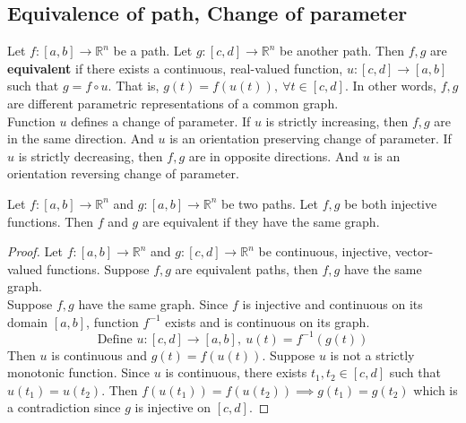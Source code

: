 \subsection{Equivalence of path, Change of parameter}
\begin{definition}
	Let $f:[a,b] \to \mathbb{R}^n$ be a path.
	Let $g : [c,d] \to \mathbb{R}^n$ be another path.
	Then $f,g$ are \textbf{equivalent} if there exists a continuous, real-valued function, $u : [c,d] \to [a,b]$ such that $g = f \circ u$.
	That is, $g(t) = f(u(t)),\ \forall t \in [c,d]$.
	In other words, $f,g$ are different parametric representations of a common graph.\\

	Function $u$ defines a change of parameter.
	If $u$ is strictly increasing, then $f,g$ are in the same direction.
	And $u$ is an orientation preserving change of parameter.
	If $u$ is strictly decreasing, then $f,g$ are in opposite directions.
	And $u$ is an orientation reversing change of parameter.
\end{definition}

\begin{theorem}
	Let $f:[a,b] \to \mathbb{R}^n$ and $g : [a,b] \to \mathbb{R}^n$ be two paths.
	Let $f,g$ be both injective functions.
	Then $f$ and $g$ are equivalent if they have the same graph.
\end{theorem}
\begin{proof}
	Let $f : [a,b] \to \mathbb{R}^n$ and $g : [c,d] \to \mathbb{R}^n$ be continuous, injective, vector-valued functions.
	Suppose $f,g$ are equivalent paths, then $f,g$ have the same graph.\\

	Suppose $f,g$ have the same graph.
	Since $f$ is injective and continuous on its domain $[a,b]$, function $f^{-1}$ exists and is continuous on its graph.
	\[ \text{Define } u:[c,d] \to [a,b],\ u(t) = f^{-1}(g(t)) \]
	Then $u$ is continuous and $g(t) = f(u(t))$.
	Suppose $u$ is not a strictly monotonic function. 
	Since $u$ is continuous, there exists $t_1,t_2 \in [c,d]$ such that $u(t_1) = u(t_2)$.
	Then $f(u(t_1)) = f(u(t_2)) \implies g(t_1) = g(t_2)$ which is a contradiction since $g$ is injective on $[c,d]$.
\end{proof}

\pagebreak
